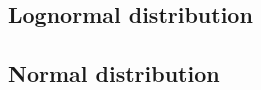 \documentclass{article}
\begin{document}
\subsection{Lognormal distribution}

\subsection{Normal distribution}
\end{document}
